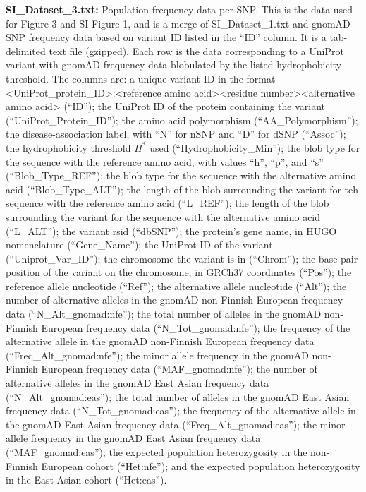 \documentclass[9pt,lineno]{elife}
\begin{document}
\textbf{SI_Dataset_3.txt:} Population frequency data per SNP. This is the data used for Figure 3 and SI Figure 1, and is a merge of SI_Dataset_1.txt and gnomAD SNP frequency data based on variant ID listed in the ``ID'' column. It is a tab-delimited text file (gzipped). Each row is the data corresponding to a UniProt variant with gnomAD frequency data blobulated by the listed hydrophobicity threshold. The columns are: a unique variant ID in the format <UniProt_protein_ID>:<reference amino acid><residue number><alternative amino acid> (``ID''); the UniProt ID of the protein containing the variant (``UniProt_Protein_ID''); the amino acid polymorphism (``AA_Polymorphism''); the disease-association label, with ``N'' for nSNP and ``D'' for dSNP (``Assoc''); the hydrophobicity threshold $H^*$ used (``Hydrophobicity_Min''); the blob type for the sequence with the reference amino acid, with values ``h'', ``p'', and ``s'' (``Blob_Type_REF''); the blob type for the sequence with the alternative amino acid (``Blob_Type_ALT''); the length of the blob surrounding the variant for teh sequence with the reference amino acid (``L_REF''); the length of the blob surrounding the variant for the sequence with the alternative amino acid (``L_ALT''); the variant rsid (``dbSNP''); the protein's gene name, in HUGO nomenclature (``Gene_Name''); the UniProt ID of the variant (``Uniprot_Var_ID''); the chromosome the variant is in (``Chrom''); the base pair position of the variant on the chromosome, in GRCh37 coordinates (``Pos''); the reference allele nucleotide (``Ref''); the alternative allele nucleotide (``Alt''); the number of alternative alleles in the gnomAD non-Finnish European frequency data (``N_Alt_gnomad:nfe''); the total number of alleles in the gnomAD non-Finnish European frequency data (``N_Tot_gnomad:nfe''); the frequency of the alternative allele in the gnomAD non-Finnish European frequency data (``Freq_Alt_gnomad:nfe''); the minor allele frequency in the gnomAD non-Finnish European frequency data (``MAF_gnomad:nfe''); the number of alternative alleles in the gnomAD East Asian frequency data (``N_Alt_gnomad:eas''); the total number of alleles in the gnomAD East Asian frequency data (``N_Tot_gnomad:eas''); the frequency of the alternative allele in the gnomAD East Asian frequency data (``Freq_Alt_gnomad:eas''); the minor allele frequency in the gnomAD East Asian frequency data (``MAF_gnomad:eas''); the expected population heterozygosity in the non-Finnish European cohort (``Het:nfe''); and the expected population heterozygosity in the East Asian cohort (``Het:eas'').
\hfill
\end{document}
